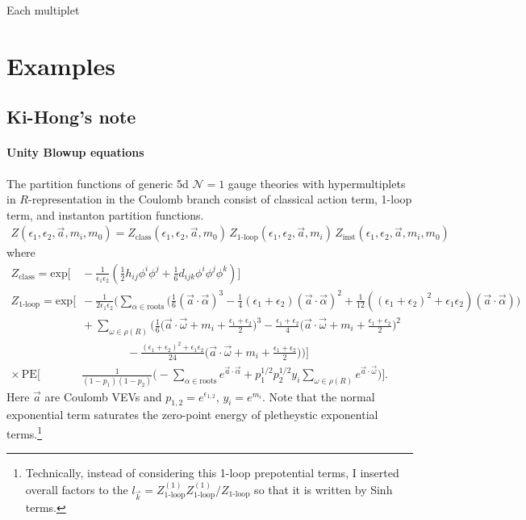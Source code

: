 \documentclass[letterpaper, 11pt]{article}
\begin{document}
Each multiplet





\section{Examples} \label{sec:example}

\subsection{Ki-Hong's note}
\paragraph{Unity Blowup equations}
The partition functions of generic 5d $\mathcal{N}=1$ gauge theories with hypermultiplets in $R$-representation in the Coulomb branch consist of classical action term, 1-loop term, and instanton partition functions.
\begin{align}
Z(\epsilon_1,\epsilon_2,\vec{a},m_i,m_0)=Z_{\textrm{class}}(\epsilon_1,\epsilon_2,\vec{a},m_0)\,Z_{\textrm{1-loop}}(\epsilon_1,\epsilon_2,\vec{a},m_i)\,Z_{\textrm{inst}}(\epsilon_1,\epsilon_2,\vec{a},m_i,m_0)
\label{eq:bueq_gen}
\end{align}
where
\begin{align}
Z_{\textrm{class}}=\textrm{exp}\Bigg[&\,-\frac{1}{\epsilon_1\epsilon_2}\left(\frac{1}{2}h_{ij}\phi^i\phi^j+\frac{1}{6}d_{ijk}\phi^{i}\phi^j\phi^k\right)\Bigg]\nonumber\\
Z_{\textrm{1-loop}}=\textrm{exp}\Bigg[&\,-\frac{1}{2\epsilon_1\epsilon_2}\Bigg(\sum_{\alpha\in\textrm{roots}}\Bigg(\frac{1}{6}(\vec{a}\cdot\vec{\alpha})^3-\frac{1}{4}(\epsilon_1+\epsilon_2)(\vec{a}\cdot\vec{\alpha})^2+\frac{1}{12}((\epsilon_1+\epsilon_2)^2+\epsilon_1\epsilon_2)(\vec{a}\cdot\vec{\alpha})\Bigg)\nonumber\\
&\,+\sum_{\omega\in\rho(R)}\Bigg(\frac{1}{6}\Big(\vec{a}\cdot\vec{\omega}+m_i+\frac{\epsilon_1+\epsilon_2}{2}\Big)^3-\frac{\epsilon_1+\epsilon_2}{4}\Big(\vec{a}\cdot\vec{\omega}+m_i+\frac{\epsilon_1+\epsilon_2}{2}\Big)^2\nonumber\\
&\,\qquad\qquad-\frac{(\epsilon_1+\epsilon_2)^2+\epsilon_1\epsilon_2}{24}\Big(\vec{a}\cdot\vec{\omega}+m_i+\frac{\epsilon_1+\epsilon_2}{2}\Big)\Bigg)\Bigg]\nonumber\\
\times\,\textrm{PE}\Bigg[&\,\frac{1}{(1-p_1)(1-p_2)}\Bigg(-\sum_{\alpha\in\textrm{roots}}e^{\vec{a}\cdot\vec{\alpha}}+p_1^{1/2}p_2^{1/2}y_i\sum_{\omega\in \rho(R)}e^{\vec{a}\cdot\vec{\omega}}\Bigg)\Bigg].
\end{align}
Here $\vec{a}$ are Coulomb VEVs and $p_{1,2}=e^{\epsilon_{1,2}}$, $y_i=e^{m_i}$. Note that the normal exponential term saturates the zero-point energy of pletheystic exponential terms.\footnote{Technically, instead of considering this 1-loop prepotential terms, I inserted overall factors to the $l_{\vec{k}}=Z_{\textrm{1-loop}}^{(1)}Z_{\textrm{1-loop}}^{(1)}/Z_{\textrm{1-loop}}$ so that it is written by Sinh terms.} 
\end{document}
